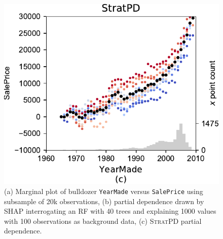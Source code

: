 \documentclass{article}
\newcommand{\spd}{\fontfamily{cmr}\textsc{\small StratPD}}
\begin{document}
\begin{figure}[htbp]
\begin{center}
\includegraphics[scale=0.35]{images/bulldozer_YearMade_stratpd.pdf}
\caption{\small (a) Marginal plot of bulldozer {\tt YearMade} versus {\tt SalePrice} using subsample of 20k observations, (b) partial dependence drawn by SHAP interrogating an RF with 40 trees and explaining 1000 values with 100 observations as background data, (c) \spd{} partial dependence.}
\label{fig:shap-stratpd-YearMade}
\end{center}
\end{figure}
\end{document}
